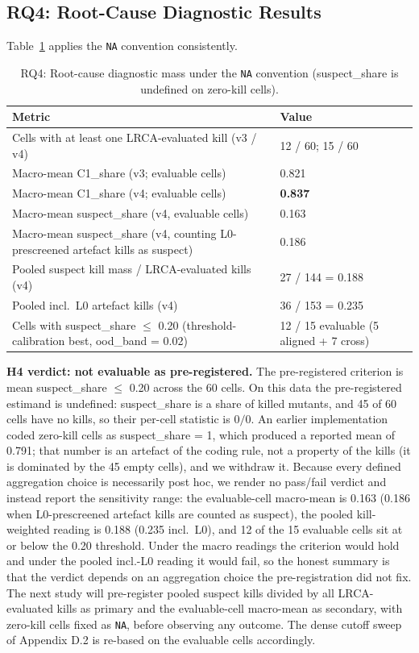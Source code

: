 \documentclass[review,12pt,authoryear]{elsarticle}
\begin{document}
\subsection{RQ4: Root-Cause Diagnostic Results}\label{h5-lrca-mass}

Table~\ref{tab:p2-13} applies the \texttt{NA} convention consistently.
\begin{table}[t]
\caption{RQ4: Root-cause diagnostic mass under the \texttt{NA}
convention (suspect\_share is undefined on zero-kill cells).}
\label{tab:p2-13}
\centering
\small
\begin{tabular}{ll}
\toprule
Metric & Value \\
\midrule
Cells with at least one LRCA-evaluated kill (v3 / v4) & 12 / 60; 15 / 60 \\
Macro-mean C1\_share (v3; evaluable cells) & 0.821 \\
Macro-mean C1\_share (v4; evaluable cells) & \textbf{0.837} \\
Macro-mean suspect\_share (v4, evaluable cells) & 0.163 \\
Macro-mean suspect\_share (v4, counting L0-prescreened artefact kills as suspect) & 0.186 \\
Pooled suspect kill mass / LRCA-evaluated kills (v4) & 27 / 144 = 0.188 \\
Pooled incl.\ L0 artefact kills (v4) & 36 / 153 = 0.235 \\
Cells with suspect\_share $\leq$ 0.20 (threshold-calibration best, ood\_band = 0.02) & 12 / 15 evaluable (5 aligned + 7 cross) \\
\bottomrule
\end{tabular}
\end{table}

\textbf{H4 verdict: not evaluable as pre-registered.} The
pre-registered criterion is mean suspect\_share $\leq$ 0.20 across the
60 cells. On this data the pre-registered estimand is undefined:
suspect\_share is a share of killed mutants, and 45 of 60 cells have no
kills, so their per-cell statistic is $0/0$. An earlier implementation
coded zero-kill cells as suspect\_share = 1, which produced a reported
mean of 0.791; that number is an artefact of the coding rule, not a
property of the kills (it is dominated by the 45 empty cells), and we
withdraw it. Because every defined aggregation choice is necessarily
post hoc, we render no pass/fail verdict and instead report the
sensitivity range: the evaluable-cell macro-mean is 0.163 (0.186 when
L0-prescreened artefact kills are counted as suspect), the pooled
kill-weighted reading is 0.188 (0.235 incl.\ L0), and 12 of the 15
evaluable cells sit at or below the 0.20 threshold. Under the macro
readings the criterion would hold and under the pooled incl.-L0 reading
it would fail, so the honest summary is that the verdict depends on an
aggregation choice the pre-registration did not fix. The next study
will pre-register pooled suspect kills divided by all LRCA-evaluated
kills as primary and the evaluable-cell macro-mean as secondary, with
zero-kill cells fixed as \texttt{NA}, before observing any outcome. The dense cutoff
sweep of Appendix D.2 is re-based on the evaluable cells accordingly.
\end{document}
